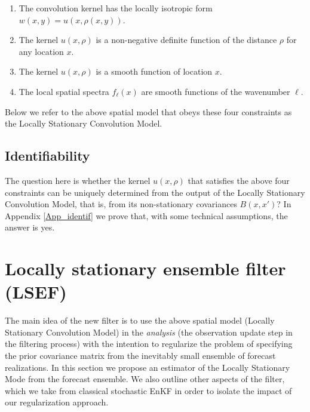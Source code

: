 \documentclass[12pt]{article}
\newcommand{\wrt}{w.r.t.\ }
\begin{document}
\begin{enumerate}
\item
The convolution kernel has the locally isotropic form $w(x,y)=u(x,\rho(x,y))$.

\item
The kernel $u(x,\rho)$ is a non-negative definite function of 
the distance $\rho$ for any location $x$.

\item
\label{list_constr_smoo_x}
The kernel $u(x,\rho)$ is a smooth function of location $x$.

\item
\label{list_constr_smoo_l}
The 
local spatial spectra  $f_\ell(x)$
are smooth functions of the wavenumber $\ell$.


\end{enumerate}

Below we refer to the above spatial model that obeys these four constraints as the Locally Stationary Convolution Model.






\subsection {Identifiability}
\label{sec_uniq}




The question here is whether the kernel $u(x,\rho)$ that satisfies the above four constraints can be uniquely determined 
from the output of the Locally Stationary Convolution Model, that is, from its
non-stationary covariances $B(x,x')$?
In  Appendix \ref{App_identif} we prove that, with some technical assumptions, the answer is yes.





\section {Locally stationary ensemble filter (LSEF)}
\label{sec_enkf}


The main idea of the new filter is to use the above spatial model (Locally Stationary Convolution Model) in the
{\em analysis} (the observation update step in the filtering process)
with the intention to regularize the problem of  specifying the prior covariance matrix from
the inevitably small ensemble of forecast realizations.
In this section we propose an estimator of the Locally Stationary Mode from the forecast ensemble.
We also outline other aspects of the filter, which we take from classical stochastic EnKF 
in order to isolate the impact of our regularization approach.
\end{document}
